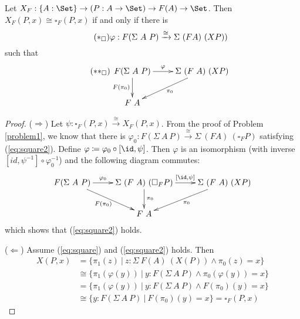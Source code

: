\documentclass{article}
\begin{document}
\begin{proposition}
  Let $X_F : \{ A : \Set\} \to (P : A \to \Set) \to F(A) \to \Set$. Then $X_F(P, x) \cong \square_F(P, x)$ if and only if there is
\begin{equation}
  \label{eq:square}
  \tag{$\ast_{\square}$}
\varphi : F (\Sigma\ A\ P) \xrightarrow{\cong} \Sigma\ (F A)\ (X P))
\end{equation}
such that
\begin{equation}
  \label{eq:square2}
  \tag{$\ast\ast_{\square}$}
\xymatrix
{
F(\Sigma\ A\ P) \ar^-{\varphi}[r] \ar_{F(\pi_0)}[d] & \Sigma\ (F\ A)\ (X P) \ar^{\pi_0}[dl] \\
F\ A  & 
}
\end{equation}
\end{proposition}
\begin{proof}
  ($\Rightarrow$) Let $\psi : \square_F(P, x) \xrightarrow{\cong}
  X_F(P, x)$. From the proof of Problem \ref{problem1}, we know that
  there is $\varphi_0 : F (\Sigma\ A\ P) \xrightarrow{\cong} \Sigma\
  (F A)\ (\square_F P)$ satisfying (\ref{eq:square2}). Define $\varphi
  \coloneqq \varphi_0 \circ [\id, \psi]$. Then $\varphi$ is an
  isomorphism (with inverse $[id, \psi^{-1}] \circ \varphi_0^{-1}$)
  and the following diagram commutes:
\[
\xymatrix
{
F(\Sigma\ A\ P) \ar^-{\varphi_0}[r] \ar_{F(\pi_0)}[dr] & \Sigma\ (F\ A)\ (\square_F P) \ar^-{[\id, \psi]}[r] \ar^{\pi_0}[d] & \Sigma\ (F\ A)\ (X P) \ar^{\pi_0}[dl] \\
& F\ A  & 
}
\]
which shows that (\ref{eq:square2}) holds.

($\Leftarrow$) Assume (\ref{eq:square}) and (\ref{eq:square2}) holds. Then
\begin{align*}
  X(P, x) &= \{ \pi_1(z)\ | \ z : \Sigma\ F(A)\ (X(P)) \wedge \pi_0(z) = x \} \\
          &\cong \{ \pi_1(\varphi(y))\ | \ y : F(\Sigma\ A\ P) \wedge \pi_0(\varphi(y)) = x \} \\
          &= \{ \pi_1(\varphi(y))\ | \ y : F(\Sigma\ A\ P) \wedge F(\pi_0)(y) = x \} \\
          &\cong \{ y : F(\Sigma\ A\ P) \ |\  F(\pi_0)(y) = x \} = \square_F(P, x)
\end{align*}
\end{proof}
\end{document}
